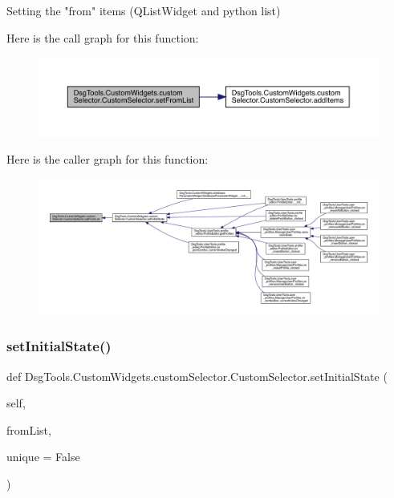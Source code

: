 \begin{DoxyVerb}Setting the "from" items (QListWidget and python list)
\end{DoxyVerb}
 Here is the call graph for this function\+:
\nopagebreak
\begin{figure}[H]
\begin{center}
\leavevmode
\includegraphics[width=350pt]{class_dsg_tools_1_1_custom_widgets_1_1custom_selector_1_1_custom_selector_a77a4ce1e5aa57b36c4ae1fada66a1259_cgraph}
\end{center}
\end{figure}
Here is the caller graph for this function\+:
\nopagebreak
\begin{figure}[H]
\begin{center}
\leavevmode
\includegraphics[width=350pt]{class_dsg_tools_1_1_custom_widgets_1_1custom_selector_1_1_custom_selector_a77a4ce1e5aa57b36c4ae1fada66a1259_icgraph}
\end{center}
\end{figure}
\mbox{\label{class_dsg_tools_1_1_custom_widgets_1_1custom_selector_1_1_custom_selector_aac11f7aaf31b6f965064f1c763820a6d}} 
\subsubsection{\texorpdfstring{set\+Initial\+State()}{setInitialState()}}
{\footnotesize\ttfamily def Dsg\+Tools.\+Custom\+Widgets.\+custom\+Selector.\+Custom\+Selector.\+set\+Initial\+State (\begin{DoxyParamCaption}\item[{}]{self,  }\item[{}]{from\+List,  }\item[{}]{unique = {\ttfamily False} }\end{DoxyParamCaption})}

